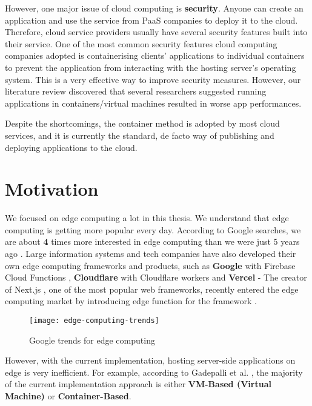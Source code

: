 However, one major issue of cloud computing is \textbf{security}. Anyone can create an application and use the service from PaaS companies to deploy it to the cloud. Therefore, cloud service providers usually have several security features built into their service. One of the most common security features cloud computing companies adopted is containerising clients' applications to individual containers to prevent the application from interacting with the hosting server's operating system. This is a very effective way to improve security measures. However, our literature review discovered that several researchers suggested running applications in containers/virtual machines resulted in worse app performances.

Despite the shortcomings, the container method is adopted by most cloud services, and it is currently the standard, de facto way of publishing and deploying applications to the cloud.

\bigskip
\section{Motivation}

We focused on edge computing a lot in this thesis. We understand that edge computing is getting more popular every day. According to Google searches, we are about \textbf{4} times more interested in edge computing than we were just 5 years ago \cite{exp1}. Large information systems and tech companies have also developed their own edge computing frameworks and products, such as \textbf{Google} with Firebase Cloud Functions \cite{exp2}, \textbf{Cloudflare} with Cloudflare workers \cite{exp3} and \textbf{Vercel} - The creator of Next.js \cite{exp4}, one of the most popular web frameworks, recently entered the edge computing market by introducing edge function for the framework \cite{exp5}.

\newpage
\bigskip
\begin{figure}[hp]
\centering
\texttt{[image: edge-computing-trends]}
\caption{\footnotesize{Google trends for edge computing \cite{exp1}}}
\captionsetup{aboveskip=0pt,font=it}
\end{figure}
\bigskip

However, with the current implementation, hosting server-side applications on edge is very inefficient. For example, according to Gadepalli et al. \cite{exp6}, the majority of the current implementation approach is either \textbf{VM-Based (Virtual Machine)} or \textbf{Container-Based}.

